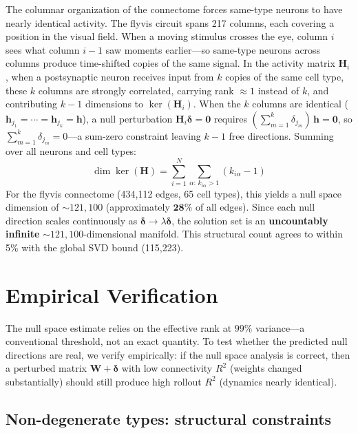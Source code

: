 \documentclass[11pt,a4paper]{article}
\begin{document}
The columnar organization of the connectome forces same-type neurons to have nearly identical activity. The flyvis circuit spans 217 columns, each covering a position in the visual field. When a moving stimulus crosses the eye, column $i$ sees what column $i-1$ saw moments earlier---so same-type neurons across columns produce time-shifted copies of the same signal. In the activity matrix $\mathbf{H}_i$, when a postsynaptic neuron receives input from $k$ copies of the same cell type, these $k$ columns are strongly correlated, carrying rank $\approx 1$ instead of $k$, and contributing $k - 1$ dimensions to $\ker(\mathbf{H}_i)$. When the $k$ columns are identical ($\mathbf{h}_{j_1} = \cdots = \mathbf{h}_{j_k} = \mathbf{h}$), a null perturbation $\mathbf{H}_i \boldsymbol{\delta} = \mathbf{0}$ requires $(\sum_{m=1}^{k} \delta_{j_m})\, \mathbf{h} = \mathbf{0}$, so $\sum_{m=1}^{k} \delta_{j_m} = 0$---a sum-zero constraint leaving $k - 1$ free directions. Summing over all neurons and cell types:
\begin{equation}
\dim\ker(\mathbf{H}) = \sum_{i=1}^{N} \sum_{\alpha:\, k_{i\alpha}>1} (k_{i\alpha} - 1)
\end{equation}
For the flyvis connectome (434,112 edges, 65 cell types), this yields a null space dimension of $\sim 121{,}100$ (approximately $\boldsymbol{28\%}$ of all edges). Since each null direction scales continuously as $\boldsymbol{\delta} \to \lambda \boldsymbol{\delta}$, the solution set is an \textbf{uncountably infinite} $\sim 121{,}100$-dimensional manifold. This structural count agrees to within 5\% with the global SVD bound (115,223).



\section{Empirical Verification}

The null space estimate relies on the effective rank at $99\%$ variance---a conventional threshold, not an exact quantity. To test whether the predicted null directions are real, we verify empirically: if the null space analysis is correct, then a perturbed matrix $\mathbf{W} + \boldsymbol{\delta}$ with low connectivity $R^2$ (weights changed substantially) should still produce high rollout $R^2$ (dynamics nearly identical).

\subsection{Non-degenerate types: structural constraints}
\end{document}
